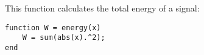 
\item[(e)]
This function calculates the total energy of a signal:

\begin{verbatim}
function W = energy(x)
    W = sum(abs(x).^2);
end
\end{verbatim}

